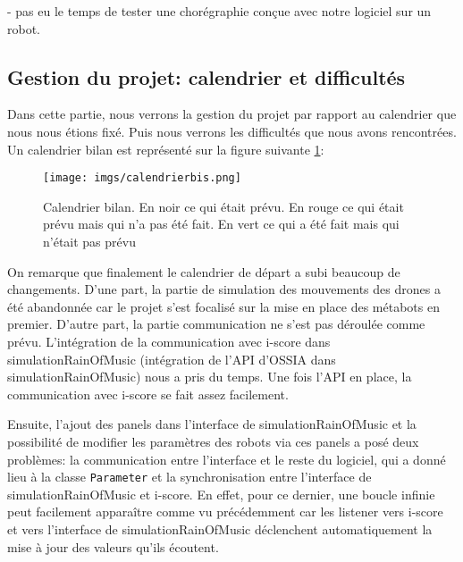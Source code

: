 - pas eu le temps de tester une chorégraphie conçue avec notre logiciel sur un robot.


\subsection{Gestion du projet: calendrier et difficultés}

Dans cette partie, nous verrons la gestion du projet par rapport au calendrier que nous nous étions fixé. Puis nous verrons les difficultés que nous avons rencontrées. Un calendrier bilan est représenté sur la figure suivante \ref{cal}:

\begin{figure}[H]
  \begin{center}
  	\texttt{[image: imgs/calendrierbis.png]}
  	\caption{Calendrier bilan. En noir ce qui était prévu. En rouge ce qui était prévu mais qui n'a pas été fait. En vert ce qui a été fait mais qui n'était pas prévu}
  	\label{cal}
  \end{center}
\end{figure}

On remarque que finalement le calendrier de départ a subi beaucoup de changements. D'une part, la partie de simulation des mouvements des drones a été abandonnée car le projet s'est focalisé sur la mise en place des métabots en premier. D'autre part, la partie communication ne s'est pas déroulée comme prévu. L'intégration de la communication avec i-score dans simulationRainOfMusic (intégration de l'API d'OSSIA dans simulationRainOfMusic) nous a pris du temps. Une fois l'API en place, la communication avec i-score se fait assez facilement. 

Ensuite, l'ajout des panels dans l'interface de simulationRainOfMusic et la possibilité de modifier les paramètres des robots via ces panels a posé deux problèmes: la communication entre l'interface et le reste du logiciel, qui a donné lieu à la classe \verb|Parameter| et la synchronisation entre l'interface de simulationRainOfMusic et i-score. En effet, pour ce dernier, une boucle infinie peut facilement apparaître comme vu précédemment car les listener vers i-score et vers l'interface de simulationRainOfMusic déclenchent automatiquement la mise à jour des valeurs qu'ils écoutent. 

